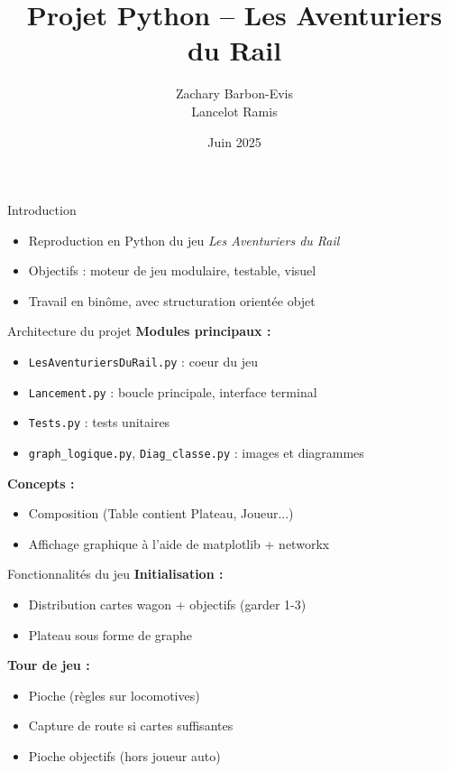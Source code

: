 \documentclass{beamer}
\title{Projet Python -- Les Aventuriers du Rail}
\author{Zachary Barbon-Evis \\ Lancelot Ramis}
\date{Juin 2025}
\begin{document}
\frame{\titlepage}

\begin{frame}{Introduction}
\begin{itemize}
    \item Reproduction en Python du jeu \textit{Les Aventuriers du Rail}
    \item Objectifs : moteur de jeu modulaire, testable, visuel
    \item Travail en bin\^ome, avec structuration orient\'ee objet
\end{itemize}
\end{frame}

\begin{frame}{Architecture du projet}
\textbf{Modules principaux :}
\begin{itemize}
    \item \texttt{LesAventuriersDuRail.py} : coeur du jeu
    \item \texttt{Lancement.py} : boucle principale, interface terminal
    \item \texttt{Tests.py} : tests unitaires
    \item \texttt{graph\_logique.py}, \texttt{Diag\_classe.py} : images et diagrammes
\end{itemize}
\textbf{Concepts :}
\begin{itemize}
    \item Composition (Table contient Plateau, Joueur...)
    \item Affichage graphique \`a l'aide de matplotlib + networkx
\end{itemize}
\end{frame}

\begin{frame}{Fonctionnalit\'es du jeu}
\textbf{Initialisation :}
\begin{itemize}
    \item Distribution cartes wagon + objectifs (garder 1-3)
    \item Plateau sous forme de graphe
\end{itemize}
\textbf{Tour de jeu :}
\begin{itemize}
    \item Pioche (r\`egles sur locomotives)
    \item Capture de route si cartes suffisantes
    \item Pioche objectifs (hors joueur auto)
\end{itemize}
\end{frame}
\end{document}
